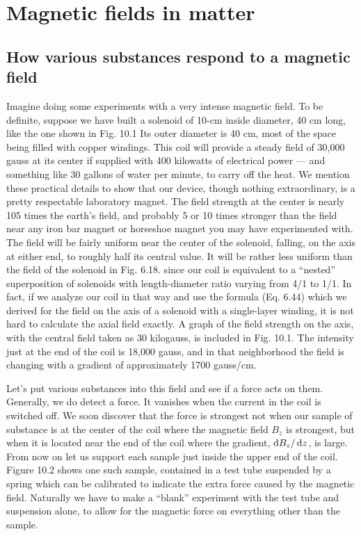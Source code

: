 \chapter{Magnetic fields in matter}

\section{How various substances respond to a magnetic field}

Imagine doing some experiments with a very intense magnetic
field. To be definite, suppose we have built a solenoid of 10-cm inside
diameter, 40 cm long, like the one shown in Fig. 10.1 Its outer
diameter is 40 cm, most of the space being filled with copper 
windings. This coil will provide a steady field of 30,000 gauss at its center
if supplied with 400 kilowatts of electrical power --- and something
like 30 gallons of water per minute, to carry off the heat. We mention
these practical details to show that our device, though nothing 
extraordinary, is a pretty respectable laboratory magnet. The field
strength at the center is nearly 105 times the earth's field, and probably
5 or 10 times stronger than the field near any iron bar magnet
or horseshoe magnet you may have experimented with. The field
will be fairly uniform near the center of the solenoid, falling, on the
axis at either end, to roughly half its central value. It will be rather
less uniform than the field of the solenoid in Fig. 6.18. since our coil
is equivalent to a ``nested'' superposition of solenoids with 
length-diameter ratio varying from 4/1 to 1/1. In fact, if we analyze our
coil in that way and use the formula (Eq. 6.44) which we derived for
the field on the axis of a solenoid with a single-layer winding, it is
not hard to calculate the axial field exactly. A graph of the field
strength on the axis, with the central field taken as 30 kilogauss, is
included in Fig. 10.1. The intensity just at the end of the coil is
18,000 gauss, and in that neighborhood the field is changing with a
gradient of approximately 1700 gauss/cm.

Let's put various substances into this field and see if a force acts
on them. Generally, we do detect a force. It vanishes when the
current in the coil is switched off. We soon discover that the force
is strongest not when our sample of substance is at the center of the
coil where the magnetic field $B_z$ is strongest, but when it is located
near the end of the coil where the gradient, $\operatorname{d\!} B_z/\operatorname{d\!} z$, is large. From
now on let us support each sample just inside the upper end of the
coil. Figure 10.2 shows one such sample, contained in a test tube
suspended by a spring which can be calibrated to indicate the extra
force caused by the magnetic field. Naturally we have to make a
``blank'' experiment with the test tube and suspension alone, to allow
for the magnetic force on everything other than the sample.

